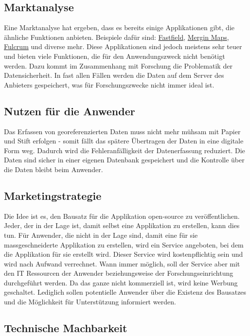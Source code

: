 \documentclass{article}
\begin{document}
\subsection{Marktanalyse} %

Eine Marktanalyse hat ergeben, dass es bereits einige Applikationen gibt, die ähnliche Funktionen
anbieten. Beispiele dafür sind: \href{https://www.fastfieldforms.com/}{Fastfield},
\href{https://merginmaps.com/}{Mergin Maps}, \href{https://www.fulcrumapp.com/}{Fulcrum} und 
diverse mehr. Diese Applikationen sind jedoch meistens sehr teuer und bieten viele Funktionen, die
für den Anwendungszweck nicht benötigt werden. Dazu kommt im Zusammenhang mit Forschung die
Problematik der Datensicherheit. In fast allen Fällen werden die Daten auf dem Server des Anbieters
gespeichert, was für Forschungszwecke nicht immer ideal ist.

\subsection{Nutzen für die Anwender} %

Das Erfassen von georeferenzierten Daten muss nicht mehr mühsam mit Papier und Stift erfolgen - somit
fällt das spätere Übertragen der Daten in eine digitale Form weg. Dadurch wird die Fehleranfälligkeit
der Datenerfassung reduziert. Die Daten sind sicher in einer eigenen Datenbank gespeichert und die
Kontrolle über die Daten bleibt beim Anwender.

\subsection{Marketingstrategie} %

Die Idee ist es, den Bausatz für die Applikation open-source zu veröffentlichen. Jeder, der in der Lage ist,
damit selbst eine Applikation zu erstellen, kann dies tun. Für Anwender, die nicht in der Lage sind,
damit eine für sie massgeschneiderte Applikation zu erstellen, wird ein Service angeboten, bei dem
die Applikation für sie erstellt wird. Dieser Service wird kostenpflichtig sein und wird nach Aufwand
verrechnet. Wann immer möglich, soll der Service aber mit den IT Ressourcen der Anwender beziehungsweise
der Forschungseinrichtung durchgeführt werden. Da das ganze nicht kommerziell ist, wird keine Werbung
geschaltet. Lediglich sollen potentielle Anwender über die Existenz des Bausatzes und die Möglichkeit
für Unterstützung informiert werden.

\subsection{Technische Machbarkeit} %
\end{document}
